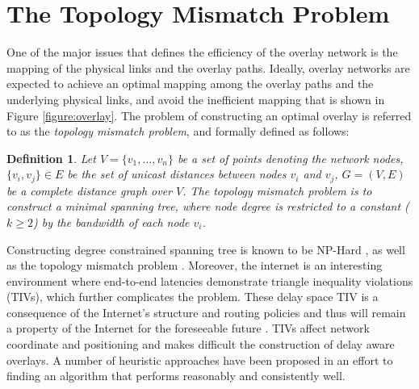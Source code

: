 \documentclass[acmcsur]{acmtrans2m}
\newtheorem{definition}[theorem]{Definition}
\begin{document}
\section{The Topology Mismatch Problem}



One of the major issues that defines the efficiency of the overlay network is
the mapping of the physical links and the overlay paths. Ideally, overlay
networks are expected to achieve an optimal mapping among the overlay paths and
the underlying physical links, and avoid the inefficient mapping that is shown
in Figure \ref{figure:overlay}. The problem of constructing an optimal overlay
is referred to as the \emph{topology mismatch problem}, and formally defined as
follows:

\begin{definition}
    Let $V = \{v_1, ..., v_n\}$ be a set of points denoting the network nodes,
    $\{v_i, v_j\} \in E$ be the set of unicast distances between nodes $v_i$ and
    $v_j$, $G=(V,E)$ be a complete distance graph over $V$. The topology
    mismatch problem is to construct a minimal spanning tree,  where 
    node degree is restricted to a constant ($k\geq 2$) by the bandwidth of each node $v_i$.
\end{definition}

Constructing degree constrained spanning tree is known to be NP-Hard
\cite{NPBOOK}, as well as the topology mismatch problem
\cite{chawathe_scattercast_2000}. 
 Moreover, the internet is an interesting environment
where end-to-end latencies demonstrate triangle inequality violations (TIVs),
which further complicates the problem.
These delay space TIV is a consequence of the Internet's structure and routing
policies and thus will remain a property of the Internet for the foreseeable
future \cite{zheng_irprtt_2005}. TIVs affect network coordinate
\cite{cox_vivaldi_2004,wong_meridian_2005} and positioning \cite{ng_gnp_2001}
and makes difficult the construction of delay aware overlays.  A number of
heuristic approaches have been proposed in an effort to finding an algorithm
that performs reasonably and consistently well.
\end{document}
